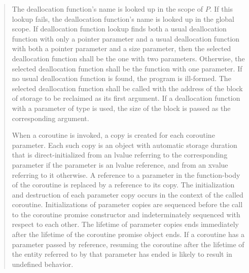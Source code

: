 \begin{quote}
\pnum
The deallocation function's name is looked up in the scope of $P$. If this lookup fails, the deallocation function's name is looked up in the global scope. If deallocation function lookup finds both a usual deallocation function with only a pointer parameter and a usual deallocation function with both a pointer parameter and a size parameter, then the selected deallocation function shall be the one with two parameters. Otherwise, the selected deallocation function shall be the function with one parameter. If no usual deallocation function is found, the program is ill-formed.
The selected deallocation function shall be called with the address of the block of storage to be reclaimed as its first argument. If a deallocation function with a parameter of type  is used, the size of the block is passed as the corresponding argument.


\pnum
When a coroutine is invoked, a copy is created for each coroutine parameter. Each such copy is an object with automatic storage duration that is direct-initialized from an lvalue referring to the corresponding parameter if the parameter is an lvalue reference, and from an xvalue referring to it otherwise. A reference to a parameter in the function-body of the coroutine is replaced by a reference to its copy.
The initialization and destruction of each parameter copy occurs in the context of the called coroutine.
Initializations of parameter copies are sequenced before the call to the coroutine promise constructor and indeterminately sequenced with respect to each other.
The lifetime of parameter copies ends immediately after the lifetime of the coroutine promise object ends.
\enternote
If a coroutine has a parameter passed by reference, resuming the coroutine after the lifetime of the entity referred to by that parameter has ended is likely to result in undefined behavior.
\exitnote
%
%


\end{quote}
